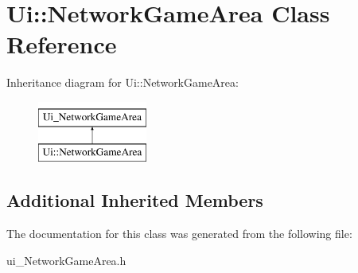 \hypertarget{class_ui_1_1_network_game_area}{\section{Ui\-:\-:Network\-Game\-Area Class Reference}
\label{class_ui_1_1_network_game_area}
}
Inheritance diagram for Ui\-:\-:Network\-Game\-Area\-:\begin{figure}[H]
\begin{center}
\leavevmode
\includegraphics[height=2.000000cm]{class_ui_1_1_network_game_area}
\end{center}
\end{figure}
\subsection*{Additional Inherited Members}


The documentation for this class was generated from the following file\-:\begin{DoxyCompactItemize}
\item 
ui\-\_\-\-Network\-Game\-Area.\-h\end{DoxyCompactItemize}
